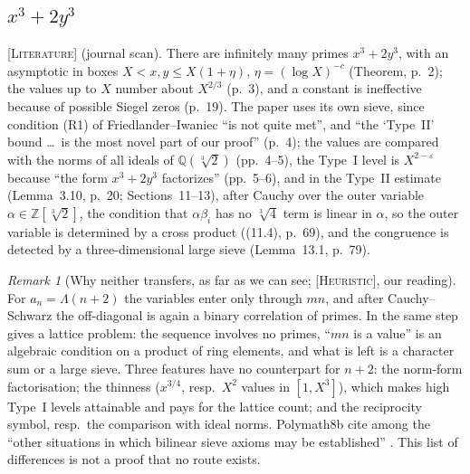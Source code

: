 \documentclass[11pt]{amsart}
\theoremstyle{definition}
\theoremstyle{remark}
\newtheorem{remark}[theorem]{Remark}
\newcommand{\lbl}[1]{\textup{\textsc{[#1]}}}
\begin{document}
\subsection{\texorpdfstring{$x^3+2y^3$}{x\textasciicircum 3+2y\textasciicircum 3}}\label{subsec:hb-x3}
\lbl{Literature} \cite{HB01} (journal scan). There are infinitely many primes
$x^3+2y^3$, with an asymptotic in boxes $X<x,y\le X(1+\eta)$,
$\eta=(\log X)^{-c}$ (Theorem, p.~2); the values up to $X$ number about
$X^{2/3}$ (p.~3), and a constant is ineffective because of possible Siegel
zeros (p.~19). The paper uses its own sieve, since condition (R1) of
Friedlander--Iwaniec ``is not quite met'', and ``the `Type~II' bound \dots\ is
the most novel part of our proof'' (p.~4); the values are compared with the
norms of all ideals of $\mathbb Q(\sqrt[3]2)$ (pp.~4--5), the Type~I level is
$X^{2-\varepsilon}$ because ``the form $x^3+2y^3$ factorizes'' (pp.~5--6), and in the
Type~II estimate (Lemma~3.10, p.~20; Sections~11--13), after Cauchy over the
outer variable $\alpha\in\mathbb Z[\sqrt[3]2]$, the condition that
$\alpha\beta_i$ has no $\sqrt[3]4$ term is linear in $\alpha$, so the outer
variable is determined by a cross product ((11.4), p.~69), and the congruence
is detected by a three-dimensional large sieve (Lemma~13.1, p.~79).

\begin{remark}[Why neither transfers, as far as we can see; \lbl{Heuristic}, our reading]\label{rem:fi-transfer}
For $a_n=\Lambda(n+2)$ the variables enter only through $mn$, and after
Cauchy--Schwarz the off-diagonal is again a binary correlation of primes. In
\cite{FI98b,HB01} the same step gives a lattice problem: the sequence
involves no primes, ``$mn$ is a value'' is an algebraic condition on a product
of ring elements, and what is left is a character sum or a large sieve. Three
features have no counterpart for $n+2$: the norm-form factorisation; the
thinness ($x^{3/4}$, resp.\ $X^2$ values in $[1,X^3]$), which makes high Type~I
levels attainable and pays for the lattice count; and the reciprocity symbol,
resp.\ the comparison with ideal norms. Polymath8b cite \cite{FI98b} among the
``other situations in which bilinear sieve axioms may be established''
\cite[p.~71]{PM8b}. This list of differences is not a proof that no route
exists.
\end{remark}
\end{document}
